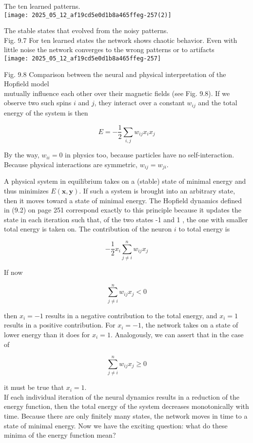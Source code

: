 \documentclass[10pt]{article}
\begin{document}
The ten learned patterns.\\
\texttt{[image: 2025\_05\_12\_af19cd5e0d1b8a465ffeg-257(2)]}

The stable states that evolved from the noisy patterns.\\
Fig. 9.7 For ten learned states the network shows chaotic behavior. Even with little noise the network converges to the wrong patterns or to artifacts\\
\texttt{[image: 2025\_05\_12\_af19cd5e0d1b8a465ffeg-257]}

Fig. 9.8 Comparison between the neural and physical interpretation of the Hopfield model\\
mutually influence each other over their magnetic fields (see Fig. 9.8). If we observe two such spins $i$ and $j$, they interact over a constant $w_{i j}$ and the total energy of the system is then

$$
E=-\frac{1}{2} \sum_{i, j} w_{i j} x_{i} x_{j}
$$

By the way, $w_{i i}=0$ in physics too, because particles have no self-interaction. Because physical interactions are symmetric, $w_{i j}=w_{j i}$.

A physical system in equilibrium takes on a (stable) state of minimal energy and thus minimizes $E(\boldsymbol{x}, \boldsymbol{y})$. If such a system is brought into an arbitrary state, then it moves toward a state of minimal energy. The Hopfield dynamics defined in (9.2) on page 251 correspond exactly to this principle because it updates the state in each iteration such that, of the two states -1 and 1 , the one with smaller total energy is taken on. The contribution of the neuron $i$ to total energy is

$$
-\frac{1}{2} x_{i} \sum_{j \neq i}^{n} w_{i j} x_{j}
$$

If now

$$
\sum_{j \neq i}^{n} w_{i j} x_{j}<0
$$

then $x_{i}=-1$ results in a negative contribution to the total energy, and $x_{i}=1$ results in a positive contribution. For $x_{i}=-1$, the network takes on a state of lower energy than it does for $x_{i}=1$. Analogously, we can assert that in the case of

$$
\sum_{j \neq i}^{n} w_{i j} x_{j} \geq 0
$$

it must be true that $x_{i}=1$.\\
If each individual iteration of the neural dynamics results in a reduction of the energy function, then the total energy of the system decreases monotonically with time. Because there are only finitely many states, the network moves in time to a state of minimal energy. Now we have the exciting question: what do these minima of the energy function mean?
\end{document}
